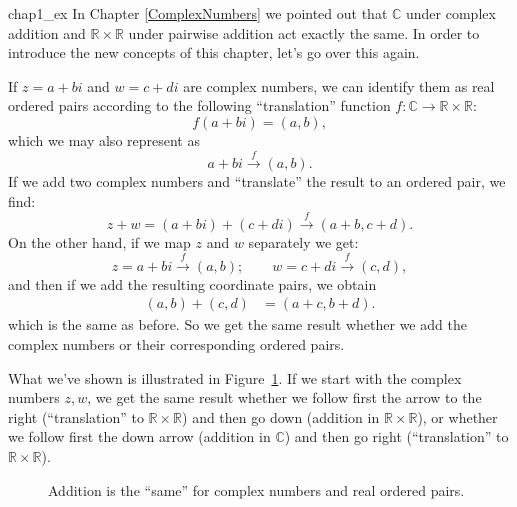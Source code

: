 \begin{example}{chap1_ex}
In Chapter \ref{ComplexNumbers} we pointed out that ${\mathbb C}$ under complex addition and ${\mathbb R} \times {\mathbb R}$ under pairwise addition act exactly the same. In order to introduce the new concepts of this chapter, let's go over this again. 

If $z = a+bi$ and $w = c+di$ are complex numbers, we can identify  them as real ordered pairs according to the following ``translation'' function $f:\mathbb{C} \rightarrow \mathbb{R} \times \mathbb{R}$:
\[f(a+bi) = (a,b),\]
which we may also represent as
\[ a+bi \xrightarrow{f} (a,b). \]
If we add two complex numbers and ``translate'' the result to an ordered pair, we find:
\[
z + w = (a + bi) + (c + di)  \xrightarrow{f} (a+b,c+d).
\]
On the other hand, if we map $z$ and $w$ separately we get:
\[
z = a + bi  \xrightarrow{f} (a,b);\qquad w = c+di  \xrightarrow{f} (c,d),
\]
and then if we add the resulting  coordinate pairs, we obtain
\begin{align*}
(a,b) +  (c,d) 
&= (a+c,b+d). 
\end{align*}
which is the same as before. So we get the same result whether we add the complex numbers or their corresponding ordered pairs.  

What we've shown  is illustrated in Figure~\ref{fig:Groups:CommDiag}. If we start with the complex numbers $z,w$, we get the same result whether we follow first the arrow to the right (``translation'' to ${\mathbb R} \times {\mathbb R}$) and then go down (addition in ${\mathbb R} \times {\mathbb R}$), or whether we follow first the down arrow (addition in ${\mathbb C}$) and then go right (``translation'' to ${\mathbb R} \times {\mathbb R}$).

\begin{figure}[htb]
	  \caption{\label{fig:Groups:CommDiag} Addition is the ``same'' for complex numbers and real ordered pairs. }
\end{figure}

\end{example}

